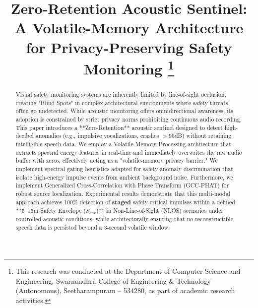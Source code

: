 \documentclass[conference]{IEEEtran}
\begin{document}
\title{Zero-Retention Acoustic Sentinel: A Volatile-Memory Architecture for Privacy-Preserving Safety Monitoring
\thanks{This research was conducted at the Department of Computer Science and Engineering, Swarnandhra College of Engineering \& Technology (Autonomous), Seetharampuram – 534280, as part of academic research activities.}
}

\author{
}

\maketitle

\begin{abstract}
Visual safety monitoring systems are inherently limited by line-of-sight occlusion, creating "Blind Spots" in complex architectural environments where safety threats often go undetected. While acoustic monitoring offers omnidirectional awareness, its adoption is constrained by strict privacy norms prohibiting continuous audio recording. This paper introduces a **Zero-Retention** acoustic sentinel designed to detect high-decibel anomalies (e.g., impulsive vocalizations, crashes $>95$dB) without retaining intelligible speech data. We employ a Volatile Memory Processing architecture that extracts spectral energy features in real-time and immediately overwrites the raw audio buffer with zeros, effectively acting as a "volatile-memory privacy barrier." We implement spectral gating heuristics adapted for safety anomaly discrimination that isolate high-energy impulse events from ambient background noise. Furthermore, we implement Generalized Cross-Correlation with Phase Transform (GCC-PHAT) for robust source localization. Experimental results demonstrate that this multi-modal approach achieves 100\% detection of \textbf{staged} safety-critical impulses within a defined **5--15m Safety Envelope ($S_{env}$)** in Non-Line-of-Sight (NLOS) scenarios under controlled acoustic conditions, while architecturally ensuring that no reconstructible speech data is persisted beyond a 3-second volatile window.
\end{abstract}
\end{document}
